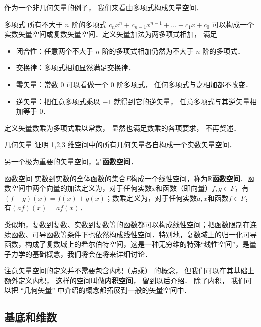 作为一个非几何矢量的例子， 我们来看由多项式构成矢量空间．

\begin{example}{多项式}\label{LSpace_ex1}
所有不大于 $n$ 阶的多项式 $c_n x^n + c_{n-1} x^{n-1} + \dots + c_1 x + c_0$ 可以构成一个实数矢量空间或复数矢量空间．定义矢量加法为两多项式相加， 满足
\begin{itemize}
\item 闭合性：任意两个不大于 $n$ 阶的多项式相加仍然为不大于 $n$ 阶的多项式．
\item 交换律：多项式相加显然满足交换律．
\item 零矢量：常数 0 可以看做一个 0 阶多项式， 任何多项式与之相加都不改变．
\item 逆矢量：把任意多项式乘以 $-1$ 就得到它的逆矢量， 任意多项式与其逆矢量相加等于 0．
\end{itemize}
定义矢量数乘为多项式乘以常数， 显然也满足数乘的各项要求， 不再赘述．
\end{example}

\begin{exercise}{几何矢量}
证明 1,2,3 维空间中的所有几何矢量各自构成一个实数矢量空间．
\end{exercise}

另一个极为重要的矢量空间，是\textbf{函数空间}．

\begin{example}{函数空间}
实数到实数的全体函数的集合$F$构成一个线性空间，称为$\mathbb{R}$\textbf{函数空间}．函数空间中两个向量的加法定义为，对于任何实数$x$和函数（即向量）$f, g\in F$，有$(f+g)(x)=f(x)+g(x)$；数乘定义为，对于任何实数$a, x$和函数$f\in F$，有$(af)(x)=af(x)$．

类似地，复数到复数、实数到复数等的函数都可以构成线性空间；把函数限制在连续函数、可导函数等条件下也依然构成线性空间．特别地，复数域上的归一化可导函数，构成了复数域上的希尔伯特空间，这是一种无穷维的特殊“线性空间”，是量子力学的基础概念，我们将会在将来详细讨论．
\end{example}

注意矢量空间的定义并不需要包含内积（点乘） 的概念， 但我们可以在其基础上额外定义内积， 这样的空间叫做\textbf{内积空间}， 留到以后介绍． 除了内积， 我们可以把 “几何矢量” 中介绍的概念都拓展到一般的矢量空间中．



\subsection{基底和维数}

